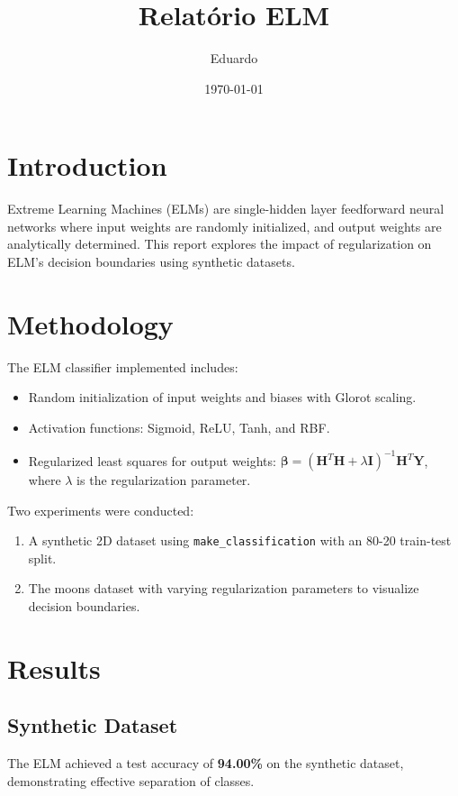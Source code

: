 \documentclass[a4paper,12pt]{article}
\begin{document}
\title{Relatório ELM}
\author{Eduardo}
\date{\today}
\maketitle

\section{Introduction}
Extreme Learning Machines (ELMs) are single-hidden layer feedforward neural networks where input weights are randomly initialized, and output weights are analytically determined. This report explores the impact of regularization on ELM's decision boundaries using synthetic datasets.

\section{Methodology}
The ELM classifier implemented includes:
\begin{itemize}
  \item Random initialization of input weights and biases with Glorot scaling.
  \item Activation functions: Sigmoid, ReLU, Tanh, and RBF.
  \item Regularized least squares for output weights: \( \mathbf{\beta} = (\mathbf{H}^T\mathbf{H} + \lambda \mathbf{I})^{-1}\mathbf{H}^T\mathbf{Y} \), where \( \lambda \) is the regularization parameter.
\end{itemize}

Two experiments were conducted:
\begin{enumerate}
  \item A synthetic 2D dataset using \texttt{make\_classification} with an 80-20 train-test split.
  \item The moons dataset with varying regularization parameters to visualize decision boundaries.
\end{enumerate}

\section{Results}
\subsection{Synthetic Dataset}
The ELM achieved a test accuracy of \textbf{94.00\%} on the synthetic dataset, demonstrating effective separation of classes.
\end{document}
